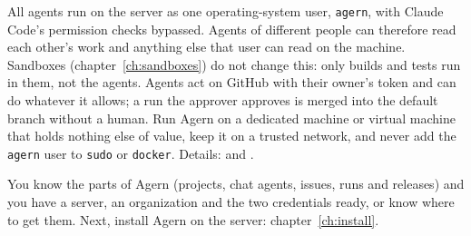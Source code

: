 \begin{warning}
All agents run on the server as one operating-system user, \texttt{agern}, with Claude Code's
permission checks bypassed. Agents of different people can therefore read each other's work and
anything else that user can read on the machine. Sandboxes (chapter~\ref{ch:sandboxes}) do not
change this: only builds and tests run in them, not the agents. Agents act on GitHub with their
owner's token and can do whatever it allows; a run the approver approves is merged into the
default branch without a human. Run Agern on a dedicated machine or virtual machine that holds
nothing else of value, keep it on a trusted network, and never add the \texttt{agern} user to
\texttt{sudo} or \texttt{docker}. Details:  and .
\end{warning}

\whatyouhave
You know the parts of Agern (projects, chat agents, issues, runs and releases) and you have a
server, an organization and the two credentials ready, or know where to get them. Next,
install Agern on the server: chapter~\ref{ch:install}.
